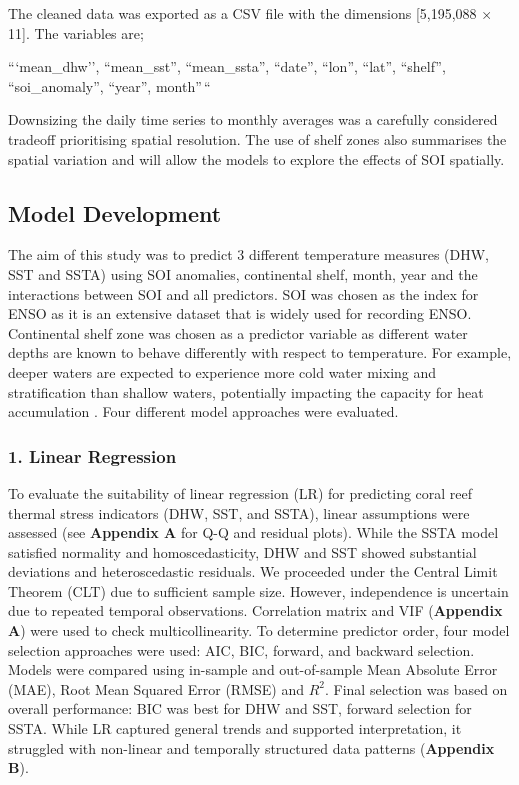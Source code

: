 \documentclass[letterpaper,9pt,twocolumn,twoside,]{pinp}
\begin{document}
The cleaned data was exported as a CSV file with the dimensions
{[}5,195,088 × 11{]}. The variables are;

```mean\_dhw'', ``mean\_sst'', ``mean\_ssta'', ``date'', ``lon'',
``lat'', ``shelf'', ``soi\_anomaly'', ``year'', month''\,``

Downsizing the daily time series to monthly averages was a carefully
considered tradeoff prioritising spatial resolution. The use of shelf
zones also summarises the spatial variation and will allow the models to
explore the effects of SOI spatially.

\subsection{Model Development}\label{model-development}

The aim of this study was to predict 3 different temperature measures
(DHW, SST and SSTA) using SOI anomalies, continental shelf, month, year
and the interactions between SOI and all predictors. SOI was chosen as
the index for ENSO as it is an extensive dataset that is widely used for
recording ENSO. Continental shelf zone was chosen as a predictor
variable as different water depths are known to behave differently with
respect to temperature. For example, deeper waters are expected to
experience more cold water mixing and stratification than shallow
waters, potentially impacting the capacity for heat accumulation
\citet{DorrellLloyd2022}. Four different model approaches were
evaluated.

\subsubsection{1. Linear Regression}\label{linear-regression}

To evaluate the suitability of linear regression (LR) for predicting
coral reef thermal stress indicators (DHW, SST, and SSTA), linear
assumptions were assessed (see \textbf{Appendix A} for Q-Q and residual
plots). While the SSTA model satisfied normality and homoscedasticity,
DHW and SST showed substantial deviations and heteroscedastic residuals.
We proceeded under the Central Limit Theorem (CLT) due to sufficient
sample size. However, independence is uncertain due to repeated temporal
observations. Correlation matrix and VIF (\textbf{Appendix A}) were used
to check multicollinearity. To determine predictor order, four model
selection approaches were used: AIC, BIC, forward, and backward
selection. Models were compared using in-sample and out-of-sample Mean
Absolute Error (MAE), Root Mean Squared Error (RMSE) and \(R^2\). Final
selection was based on overall performance: BIC was best for DHW and
SST, forward selection for SSTA. While LR captured general trends and
supported interpretation, it struggled with non-linear and temporally
structured data patterns (\textbf{Appendix B}).
\end{document}
